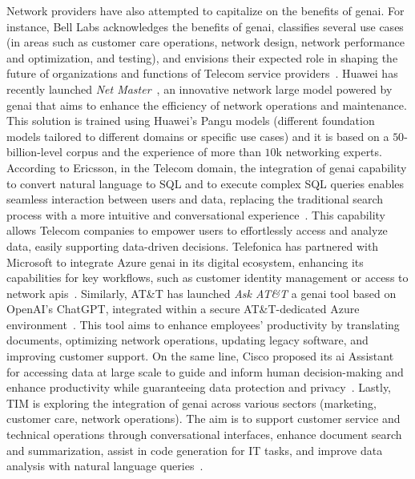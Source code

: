 Network providers have also attempted to capitalize on the benefits of \gls{genai}.
For instance, Bell Labs acknowledges the benefits of \gls{genai}, 
classifies several use cases
(in areas such as customer care operations, network design, network performance and optimization, and testing), 
and envisions their expected role in shaping the future of organizations and functions of Telecom service providers~\cite{nokia}.
Huawei has recently launched \emph{Net Master}~\cite{huawei},
an innovative network large model
powered by \gls{genai} 
that aims to enhance the efficiency of network operations and maintenance.
This solution is trained using Huawei's Pangu models
(\ie different foundation models tailored to different domains or specific use cases) 
and it is based on a $50$-billion-level corpus and the experience of more than $10$k networking experts. 
According to Ericsson,
in the Telecom domain, the integration of \gls{genai} capability to convert natural language to SQL and to execute complex SQL queries enables seamless interaction between users and data,
replacing the traditional search process with a more intuitive and conversational experience~\cite{ericsson}.
This capability allows Telecom companies to empower users to effortlessly access and analyze data, easily supporting data-driven decisions.
Telefonica has partnered with Microsoft to integrate Azure 
\gls{genai} in its digital ecosystem, enhancing its capabilities for key workflows, 
such as customer identity management or access to network \glspl{api}~\cite{telefonica}.
Similarly, AT\&T has launched \emph{Ask AT\&T} a \gls{genai} tool based on OpenAI’s ChatGPT, integrated within a secure AT\&T-dedicated Azure environment~\cite{att}.
This tool aims to enhance employees' productivity by translating documents, optimizing network operations, updating legacy software, and improving customer support. 
On the same line,
Cisco proposed its \gls{ai} Assistant for accessing data at large scale 
to guide and inform human decision-making and enhance productivity while guaranteeing data protection and privacy~\cite{cisco}.
Lastly, TIM
is exploring the integration of \gls{genai} across various sectors (\eg marketing, customer care, network operations).
%
The aim is to support customer service and technical operations through conversational interfaces,
enhance document search and summarization, assist in code generation for IT tasks, 
and improve data analysis with natural language queries~\cite{tim}.
%











